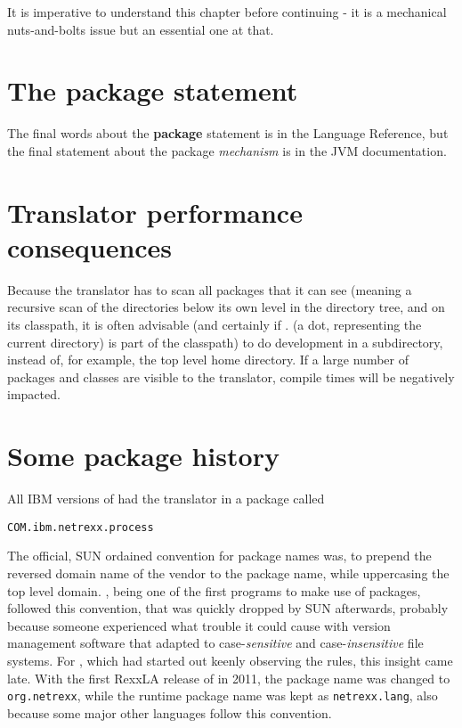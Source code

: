 {It is imperative to understand this chapter before continuing - it is
a mechanical nuts-and-bolts issue but an essential one at that.

\section{The package statement}
The final words about the \nr{} \textbf{package} statement is in the
\nr{} Language Reference, but the final statement about the package
\emph{mechanism} is in the JVM documentation.
\section{Translator performance consequences}
Because the \nr{} translator has to scan all packages that it can
see (meaning a recursive scan of the directories below its own level
in the directory tree, and on its classpath, it is often advisable
(and certainly if . (a dot, representing the current directory) is part of the classpath)
to do development in a subdirectory, instead of, for example, the top
level home directory. If a large number of packages and classes are
visible to the translator, compile times will be negatively impacted. 

\section{Some \nr{} package history}
All IBM versions of \nr{} had the translator in a package called
\begin{verbatim}
COM.ibm.netrexx.process 
\end{verbatim}
The official, SUN ordained
convention for package names was, to prepend the reversed domain name
of the vendor to the package name, while uppercasing the top level
domain. \nr{}, being one of the first programs to make use of
packages, followed this convention, that was quickly dropped by SUN
afterwards, probably because someone experienced what trouble it could
cause with version management software that adapted to
case-\emph{sensitive} and case-\emph{insensitive} file systems. For
\nr{}, which had started out keenly observing the rules, this
insight came late. With the first RexxLA release of \nr{} in 2011, the package
name was changed to \texttt{org.netrexx}, while the runtime package
name was kept as \texttt{netrexx.lang}, also because some major other
languages follow this convention.



}
